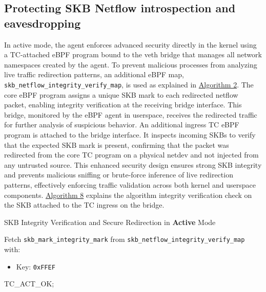 \documentclass [11pt, proquest] {uwthesis}[2020/02/24]
\begin{document}
\subsection{Protecting SKB Netflow introspection and eavesdropping}
In active mode, the agent enforces advanced security directly in the kernel using a TC-attached eBPF program bound to the veth bridge that manages all network namespaces created by the agent. To prevent malicious processes from analyzing live traffic redirection patterns, an additional eBPF map, \texttt{skb\_netflow\_integrity\_verify\_map}, is used as explained in \hyperref[sec:alg2]{Algorithm 2}. The core eBPF program assigns a unique SKB mark to each redirected netflow packet, enabling integrity verification at the receiving bridge interface. This bridge, monitored by the eBPF agent in userspace, receives the redirected traffic for further analysis of suspicious behavior.
An additional ingress TC eBPF program is attached to the bridge interface. It inspects incoming SKBs to verify that the expected SKB mark is present, confirming that the packet was redirected from the core TC program on a physical netdev and not injected from any untrusted source. This enhanced security design ensures strong SKB integrity and prevents malicious sniffing or brute-force inference of live redirection patterns, effectively enforcing traffic validation across both kernel and userspace components. \hyperref[sec:alg8]{Algorithm 8} explains the algorithm integrity verification check on the SKB attached to the TC ingress on the bridge.

\begin{algorithm}[H]
\label{sec:alg8}
\caption{SKB Integrity Verification and Secure Redirection in \textbf{Active} Mode}
\label{sec:alg_active_mode_integrity}

\small
{}


Fetch \texttt{skb\_mark\_integrity\_mark} from \texttt{skb\_netflow\_integrity\_verify\_map} with:
\begin{itemize}[nosep]
    \item Key: \texttt{0xFFEF} 
\end{itemize}


\Return TC\_ACT\_OK;\
\end{algorithm}
\end{document}
